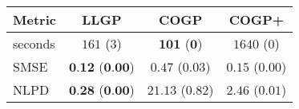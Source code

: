 \begin{tabular}{lccc}\toprule
Metric & LLGP & COGP & COGP+\\
\midrule
seconds & $161$ ($3$) & $\textbf{101}$ ($\textbf{0}$) & $1640$ ($0$)\\
SMSE & $\textbf{0.12}$ ($\textbf{0.00}$) & $0.47$ ($0.03$) & $0.15$ ($0.00$)\\
NLPD & $\textbf{0.28}$ ($\textbf{0.00}$) & $21.13$ ($0.82$) & $2.46$ ($0.01$)\\

\bottomrule
\end{tabular}
